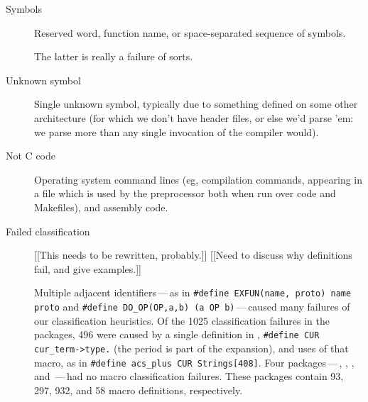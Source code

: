 \begin{description}
\item[Symbols]  Reserved word, function name, or space-separated sequence
of symbols.

The latter is really a failure of sorts.

\item[Unknown symbol]  Single unknown symbol, typically due to something
defined on some other architecture (for which we don't have header files,
or else we'd parse 'em:  we parse more than any single invocation of the
compiler would).


\item[Not C code]  Operating system command lines (eg, compilation
commands, appearing in a file which is used by the preprocessor both when
run over code and Makefiles), and assembly code.







\item[Failed classification]

  [[This needs to be rewritten, probably.]]
  [[Need to discuss why definitions fail, and give examples.]]

  Multiple adjacent identifiers\,---\,as in
  {\tt \#define EXFUN(name, proto) name proto} and {\tt \#define
  \verb|DO_OP|(OP,a,b) (a OP b)}\,---\,caused many failures of our
  classification heuristics.  Of the 1025 classification failures in the
  {\numpackages} packages, 496 were caused by a single definition in
  , {\tt \#define CUR \verb|cur_term->type.|} (the period is
  part of the expansion), and uses of that macro, as in {\tt \#define
  \verb|acs_plus| CUR Strings[408]}.  Four packages\,---\,,
  , , and \,---\,had no macro
  classification failures.  These packages contain 93, 297, 932, and 58 macro
  definitions, respectively.



\end{description}
